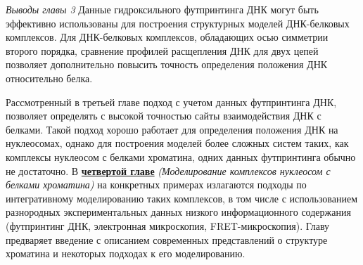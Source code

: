 \textit{Выводы главы 3} \newline
Данные гидроксильного футпринтинга ДНК могут быть эффективно использованы для построения структурных моделей ДНК-белковых комплексов. Для ДНК-белковых комплексов, обладающих осью симметрии второго порядка, сравнение профилей расщепления ДНК для двух цепей позволяет дополнительно повысить точность определения положения ДНК относительно белка. 






Рассмотренный в третьей главе подход с учетом данных футпринтинга ДНК, позволяет определять с высокой точностью сайты взаимодействия ДНК с белками. Такой подход хорошо работает для определения положения ДНК на нуклеосомах, однако для построения моделей более сложных систем таких, как комплексы нуклеосом с белками хроматина, одних данных футпринтинга обычно не достаточно. В \underline{\textbf{четвертой главе}} \textit{(Моделирование комплексов нуклеосом с белками хроматина)} на конкретных примерах излагаются подходы по интегративному моделированию таких комплексов, в том числе с использованием разнородных экспериментальных данных низкого информационного содержания (футпринтинг ДНК, электронная микроскопия, FRET-микроскопия). Главу предваряет введение с описанием современных представлений о структуре хроматина и некоторых подходах к его моделированию.

